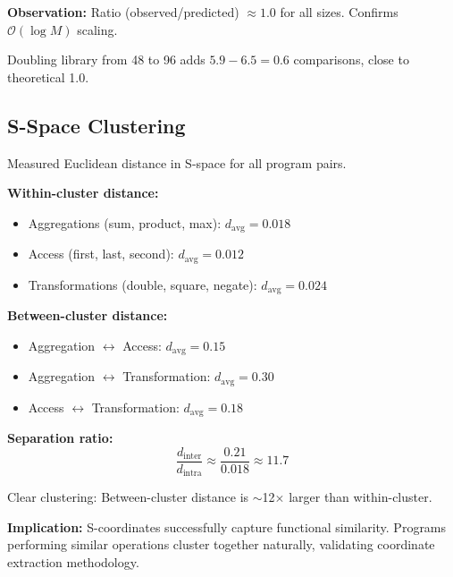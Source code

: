 \documentclass[twocolumn,10pt]{article}
\theoremstyle{definition}
\theoremstyle{remark}
\newcommand{\bigO}{\mathcal{O}}
\begin{document}
\textbf{Observation:} Ratio (observed/predicted) $\approx 1.0$ for all sizes. Confirms $\bigO(\log M)$ scaling.

Doubling library from 48 to 96 adds $5.9 - 6.5 = 0.6$ comparisons, close to theoretical 1.0.

\subsection{S-Space Clustering}

Measured Euclidean distance in S-space for all program pairs.

\textbf{Within-cluster distance:}
\begin{itemize}
\item Aggregations (sum, product, max): $d_{\text{avg}} = 0.018$
\item Access (first, last, second): $d_{\text{avg}} = 0.012$
\item Transformations (double, square, negate): $d_{\text{avg}} = 0.024$
\end{itemize}

\textbf{Between-cluster distance:}
\begin{itemize}
\item Aggregation $\leftrightarrow$ Access: $d_{\text{avg}} = 0.15$
\item Aggregation $\leftrightarrow$ Transformation: $d_{\text{avg}} = 0.30$
\item Access $\leftrightarrow$ Transformation: $d_{\text{avg}} = 0.18$
\end{itemize}

\textbf{Separation ratio:}
\begin{equation}
\frac{d_{\text{inter}}}{d_{\text{intra}}} \approx \frac{0.21}{0.018} \approx 11.7
\end{equation}

Clear clustering: Between-cluster distance is $\sim$12$\times$ larger than within-cluster.

\vspace{0.2cm}
\noindent\textbf{Implication:} S-coordinates successfully capture functional similarity. Programs performing similar operations cluster together naturally, validating coordinate extraction methodology.
\end{document}
